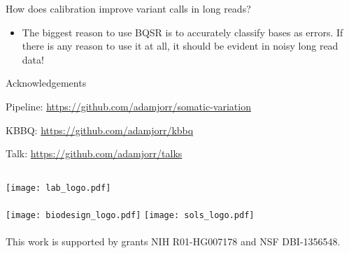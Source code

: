 \documentclass{beamer}
\begin{document}
\begin{frame}{How does calibration improve variant calls in long reads?}
\begin{itemize}
\item The biggest reason to use BQSR is to accurately classify bases as errors. If there is any reason to use it at all, it should be evident in noisy long read data!
\end{itemize}
\end{frame}

\begin{frame}{Acknowledgements}

Pipeline:  \url{https://github.com/adamjorr/somatic-variation}

KBBQ:  \url{https://github.com/adamjorr/kbbq}

Talk:  \url{https://github.com/adamjorr/talks}

\vfill

\begin{columns}
	\texttt{[image: lab\_logo.pdf]}
	\\~\\
	\texttt{[image: biodesign\_logo.pdf]}
	\texttt{[image: sols\_logo.pdf]}
	\\~\\
	This work is supported by grants NIH R01-HG007178 and NSF DBI-1356548.
\end{columns}

\end{frame}
\end{document}
